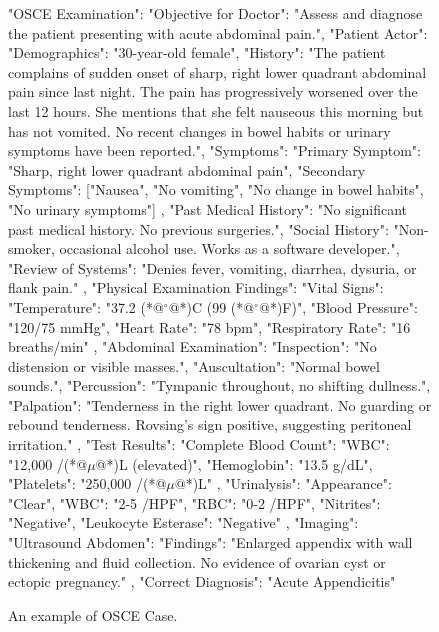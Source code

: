 \documentclass[11pt]{article}
\begin{document}
\begin{figure}[htbp]
	\caption{An example of OSCE Case.}
	\begin{promptlisting}
		\quad
		{
			"OSCE Examination": {
				"Objective for Doctor": "Assess and diagnose the patient presenting with acute abdominal pain.",
				"Patient Actor": {
					"Demographics": "30-year-old female",
					"History": "The patient complains of sudden onset of sharp, right lower quadrant abdominal pain since last night. The pain has progressively worsened over the last 12 hours. She mentions that she felt nauseous this morning but has not vomited. No recent changes in bowel habits or urinary symptoms have been reported.",
					"Symptoms": {
						"Primary Symptom": "Sharp, right lower quadrant abdominal pain",
						"Secondary Symptoms": ["Nausea", "No vomiting", "No change in bowel habits", "No urinary symptoms"]
					},
					"Past Medical History": "No significant past medical history. No previous surgeries.",
					"Social History": "Non-smoker, occasional alcohol use. Works as a software developer.",
					"Review of Systems": "Denies fever, vomiting, diarrhea, dysuria, or flank pain."
				},
				"Physical Examination Findings": {
					"Vital Signs": {
						"Temperature": "37.2 (*@$^\circ$@*)C (99 (*@$^\circ$@*)F)",
						"Blood Pressure": "120/75 mmHg",
						"Heart Rate": "78 bpm",
						"Respiratory Rate": "16 breaths/min"
					},
					"Abdominal Examination": {
						"Inspection": "No distension or visible masses.",
						"Auscultation": "Normal bowel sounds.",
						"Percussion": "Tympanic throughout, no shifting dullness.",
						"Palpation": "Tenderness in the right lower quadrant. No guarding or rebound tenderness. Rovsing's sign positive, suggesting peritoneal irritation."
					}
				},
				"Test Results": {
					"Complete Blood Count": {
						"WBC": "12,000 /(*@$\mu$@*)L (elevated)",
						"Hemoglobin": "13.5 g/dL",
						"Platelets": "250,000 /(*@$\mu$@*)L"
					},
					"Urinalysis": {
						"Appearance": "Clear",
						"WBC": "2-5 /HPF",
						"RBC": "0-2 /HPF",
						"Nitrites": "Negative",
						"Leukocyte Esterase": "Negative"
					},
					"Imaging": {
						"Ultrasound Abdomen": {
							"Findings": "Enlarged appendix with wall thickening and fluid collection. No evidence of ovarian cyst or ectopic pregnancy."
						}
					}
				},
				"Correct Diagnosis": "Acute Appendicitis"
			}
		}
		
		
	\end{promptlisting}
	\label{prompt9}
\end{figure}
\end{document}
